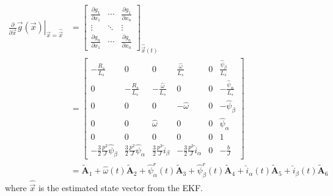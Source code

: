 \documentclass[11pt,a4paper,oneside]{book}
\numberwithin{equation}{section}
\theoremstyle{it}
\theoremstyle{definition}
\begin{document}
\begin{mybox}
	\begin{equation}\label{}
		\begin{aligned}
			\left.\frac{\partial}{\partial 
				\vec{x}}\vec{g}(\vec{x})\right|_{\vec{x}=\hat{\vec{x}}} &= 
			\begin{bmatrix} \frac{\partial g_1}{\partial x_1} & \cdots & 
				\frac{\partial g_1}{\partial x_n} \\[6pt]
				\vdots & \ddots & \vdots \\[6pt]
				\frac{\partial g_n}{\partial x_1} & \cdots & \frac{\partial 
					g_n}{\partial x_n}
			\end{bmatrix}_{\hat{\vec{x}}(t)} \\[8pt]
			&= \begin{bmatrix} 
				-\frac{R_s}{L_s} & 0 & 0 & \frac{\hat{\omega}}{L_s} & 0 & \frac{\hat{\psi}_\beta}{L_s} \\[6pt]			
				0 & -\frac{R_s}{L_s} & -\frac{\hat{\omega}}{L_s} & 0 & 0 & -\frac{\hat{\psi}_\alpha}{L_s} \\[6pt]
				0 & 0 & 0 & -\hat{\omega} & 0 & -\hat{\psi}_\beta \\[6pt]
				0 & 0 & \hat{\omega} & 0 & 0 & \hat{\psi}_\alpha \\[6pt]
				0 & 0 & 0 & 0 & 0 & 1 \\[6pt]
				-\frac{3}{2}\frac{p^2}{J}\hat{\psi}_\beta & \frac{3}{2}\frac{p^2}{J}\hat{\psi}_\alpha
				& \frac{3}{2}\frac{p^2}{J}\hat{i}_\beta & -\frac{3}{2}\frac{p^2}{J}\hat{i}_\alpha & 0 & -\frac{b}{J}
			\end{bmatrix}  \\[8pt]
			&=\tilde{\mathbf{A}}_1 + 
			\hat{\omega}(t) \tilde{\mathbf{A}}_2 + \hat{\psi}_\alpha^r(t) 
			\tilde{\mathbf{A}}_3 + \hat{\psi}_\beta^r(t) \tilde{\mathbf{A}}_4
			+ \hat{i}_\alpha(t) 
			\tilde{\mathbf{A}}_5 + \hat{i}_\beta(t) \tilde{\mathbf{A}}_6
		\end{aligned}
	\end{equation} 
	where $\hat{\vec{x}}$ is the estimated state vector from the EKF.
\end{mybox}
\end{document}

